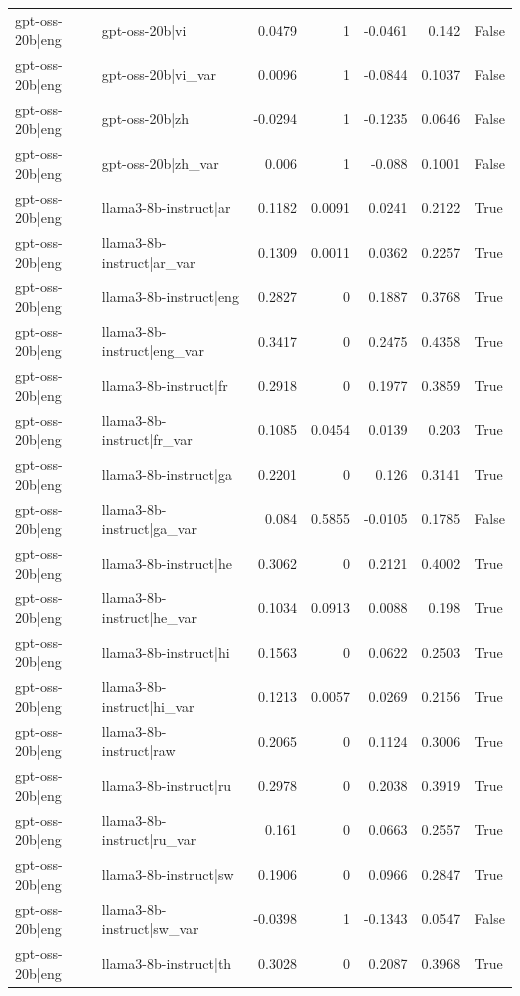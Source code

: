 \begin{table}
\begin{tabular}{l l r r r r l}
gpt-oss-20b|eng & gpt-oss-20b|vi & 0.0479 & 1 & -0.0461 & 0.142 & False \\
gpt-oss-20b|eng & gpt-oss-20b|vi_var & 0.0096 & 1 & -0.0844 & 0.1037 & False \\
gpt-oss-20b|eng & gpt-oss-20b|zh & -0.0294 & 1 & -0.1235 & 0.0646 & False \\
gpt-oss-20b|eng & gpt-oss-20b|zh_var & 0.006 & 1 & -0.088 & 0.1001 & False \\
gpt-oss-20b|eng & llama3-8b-instruct|ar & 0.1182 & 0.0091 & 0.0241 & 0.2122 & True \\
gpt-oss-20b|eng & llama3-8b-instruct|ar_var & 0.1309 & 0.0011 & 0.0362 & 0.2257 & True \\
gpt-oss-20b|eng & llama3-8b-instruct|eng & 0.2827 & 0 & 0.1887 & 0.3768 & True \\
gpt-oss-20b|eng & llama3-8b-instruct|eng_var & 0.3417 & 0 & 0.2475 & 0.4358 & True \\
gpt-oss-20b|eng & llama3-8b-instruct|fr & 0.2918 & 0 & 0.1977 & 0.3859 & True \\
gpt-oss-20b|eng & llama3-8b-instruct|fr_var & 0.1085 & 0.0454 & 0.0139 & 0.203 & True \\
gpt-oss-20b|eng & llama3-8b-instruct|ga & 0.2201 & 0 & 0.126 & 0.3141 & True \\
gpt-oss-20b|eng & llama3-8b-instruct|ga_var & 0.084 & 0.5855 & -0.0105 & 0.1785 & False \\
gpt-oss-20b|eng & llama3-8b-instruct|he & 0.3062 & 0 & 0.2121 & 0.4002 & True \\
gpt-oss-20b|eng & llama3-8b-instruct|he_var & 0.1034 & 0.0913 & 0.0088 & 0.198 & True \\
gpt-oss-20b|eng & llama3-8b-instruct|hi & 0.1563 & 0 & 0.0622 & 0.2503 & True \\
gpt-oss-20b|eng & llama3-8b-instruct|hi_var & 0.1213 & 0.0057 & 0.0269 & 0.2156 & True \\
gpt-oss-20b|eng & llama3-8b-instruct|raw & 0.2065 & 0 & 0.1124 & 0.3006 & True \\
gpt-oss-20b|eng & llama3-8b-instruct|ru & 0.2978 & 0 & 0.2038 & 0.3919 & True \\
gpt-oss-20b|eng & llama3-8b-instruct|ru_var & 0.161 & 0 & 0.0663 & 0.2557 & True \\
gpt-oss-20b|eng & llama3-8b-instruct|sw & 0.1906 & 0 & 0.0966 & 0.2847 & True \\
gpt-oss-20b|eng & llama3-8b-instruct|sw_var & -0.0398 & 1 & -0.1343 & 0.0547 & False \\
gpt-oss-20b|eng & llama3-8b-instruct|th & 0.3028 & 0 & 0.2087 & 0.3968 & True \\

\end{tabular}
\end{table}
